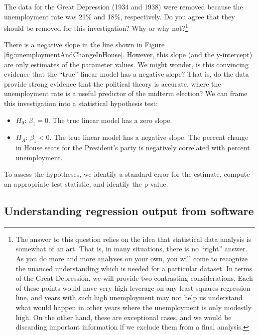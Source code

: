 \documentclass[
  10pt,
  openany]{book}
\providecommand{\tightlist}{%
  \setlength{\itemsep}{0pt}\setlength{\parskip}{0pt}}
\theoremstyle{definition}
\theoremstyle{definition}
\theoremstyle{definition}
\theoremstyle{definition}
\theoremstyle{remark}
\begin{document}
The data for the Great Depression (1934 and 1938) were removed because
the unemployment rate was 21\% and 18\%, respectively. Do you agree that
they should be removed for this investigation? Why or why not?\footnote{The answer to this question relies on the idea that statistical data analysis is somewhat of an art. That is, in many situations, there is no ``right'' answer. As you do more and more analyses on your own, you will come to recognize the nuanced understanding which is needed for a particular dataset. In terms of the Great Depression, we will provide two contrasting considerations.
  Each of these points would have very high leverage on any
  least-squares regression line, and years with such high
  unemployment may not help us understand what would happen
  in other years where the unemployment is only modestly high.
  On the other hand, these are exceptional cases, and we would
  be discarding important information if we exclude them from
  a final analysis.}

There is a negative slope in the line shown in Figure \ref{fig:unemploymentAndChangeInHouse}. However, this slope (and the
y-intercept) are only estimates of the parameter values. We might
wonder, is this convincing evidence that the ``true'' linear model has a
negative slope? That is, do the data provide strong evidence that the
political theory is accurate, where the unemployment rate is a useful
predictor of the midterm election? We can frame this investigation into
a statistical hypothesis test:

\begin{itemize}
\tightlist
\item
  \(H_0\): \(\beta_1 = 0\). The true linear model has a zero slope.\\
\item
  \(H_A\): \(\beta_1 < 0\). The true linear model has a negative slope. The percent change in House seats for the President's party is negatively correlated with percent unemployment.
\end{itemize}

To assess the hypotheses, we identify a standard error for the estimate, compute an appropriate test statistic, and identify the p-value.

\subsection{Understanding regression output from software}\label{understanding-regression-output-from-software}
\end{document}
